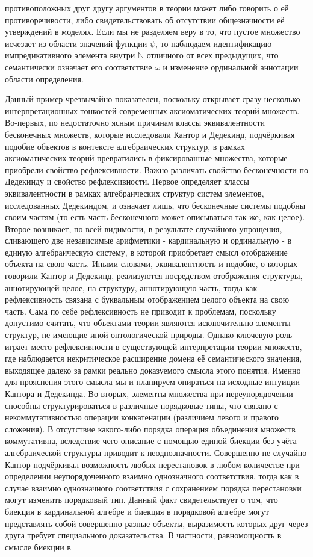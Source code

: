 \documentclass[12pt]{article}
\begin{document}
противоположных друг другу аргументов в теории может либо говорить о её противоречивости, либо свидетельствовать об отсутствии общезначности её утверждений в моделях. Если мы не разделяем веру в то, что пустое множество исчезает из области значений функции $\psi$, то наблюдаем идентификацию импредикативного элемента внутри $\mathbb{N}$ отличного от всех предыдущих, что семантически означает его соответствие $\omega$ и изменение ординальной аннотации области определения.

Данный пример чрезвычайно показателен, поскольку открывает сразу несколько интерпретационных тонкостей современных аксиоматических теорий множеств. Во-первых, по недостаточно ясным причинам классы эквивалентности бесконечных множеств, которые исследовали Кантор и Дедекинд, подчёркивая подобие объектов в контексте алгебраических структур, в рамках аксиоматических теорий превратились в фиксированные множества, которые приобрели свойство рефлексивности. Важно различать свойство бесконечности по Дедекинду \cite{dedekind-infinite-set} и свойство рефлексивности. Первое определяет классы эквивалентности в рамках алгебраических структур систем элементов, исследованных Дедекиндом, и означает лишь, что бесконечные системы подобны своим частям (то есть часть бесконечного может описываться так же, как целое). Второе возникает, по всей видимости, в результате случайного упрощения, сливающего две независимые арифметики - кардинальную и ординальную - в единую алгебраическую систему, в которой приобретает смысл отображение объекта на свою часть. Иными словами, эквивалентность и подобие, о которых говорили Кантор и Дедекинд, реализуются посредством отображения структуры, аннотирующей целое, на структуру, аннотирующую часть, тогда как рефлексивность связана с буквальным отображением целого объекта на свою часть. Сама по себе рефлексивность не приводит к проблемам, поскольку допустимо считать, что объектами теории являются исключительно элементы структур, не имеющие иной онтологической природы. Однако ключевую роль играет место рефлексивности в существующей интерпретации теории множеств, где наблюдается некритическое расширение домена её семантического значения, выходящее далеко за рамки реально доказуемого смысла этого понятия. Именно для прояснения этого смысла мы и планируем опираться на исходные интуиции Кантора и Дедекинда. Во-вторых, элементы множества при переупорядочении способны структурироваться в различные порядковые типы, что связано с некоммутативностью операции конкатенации (различием левого и правого сложения). В отсутствие какого-либо порядка операция объединения множеств коммутативна, вследствие чего описание с помощью единой биекции без учёта алгебраической структуры приводит к неоднозначности. Совершенно не случайно Кантор подчёркивал возможность любых перестановок в любом количестве при определении неупорядоченного взаимно однозначного соответствия, тогда как в случае взаимно однозначного соответствия с сохранением порядка перестановки могут изменить порядковый тип. Данный факт свидетельствует о том, что биекция в кардинальной алгебре и биекция в порядковой алгебре могут представлять собой совершенно разные объекты, выразимость которых друг через друга требует специального доказательства. В частности, равномощность в смысле биекции в 
\end{document}
